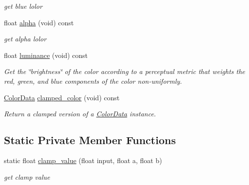 \begin{DoxyCompactItemize}
\begin{DoxyCompactList}\small\item\em get blue lolor \end{DoxyCompactList}\item 
float \hyperlink{classimage__tools_1_1ColorData_a8ae370ebb683fcfab1ce7dfdac9f78a2}{alpha} (void) const \hypertarget{classimage__tools_1_1ColorData_a8ae370ebb683fcfab1ce7dfdac9f78a2}{}\label{classimage__tools_1_1ColorData_a8ae370ebb683fcfab1ce7dfdac9f78a2}

\begin{DoxyCompactList}\small\item\em get alpha lolor \end{DoxyCompactList}\item 
float \hyperlink{classimage__tools_1_1ColorData_a9bea35824e209d2c216739fdc8b9bf3f}{luminance} (void) const \hypertarget{classimage__tools_1_1ColorData_a9bea35824e209d2c216739fdc8b9bf3f}{}\label{classimage__tools_1_1ColorData_a9bea35824e209d2c216739fdc8b9bf3f}

\begin{DoxyCompactList}\small\item\em Get the \char`\"{}brightness\char`\"{} of the color according to a perceptual metric that weights the red, green, and blue components of the color non-\/uniformly. \end{DoxyCompactList}\item 
\hyperlink{classimage__tools_1_1ColorData}{Color\+Data} \hyperlink{classimage__tools_1_1ColorData_add7ac66b4e579f06f59f03c2206a0429}{clamped\+\_\+color} (void) const 
\begin{DoxyCompactList}\small\item\em Return a clamped version of a \hyperlink{classimage__tools_1_1ColorData}{Color\+Data} instance. \end{DoxyCompactList}\end{DoxyCompactItemize}
\subsection*{Static Private Member Functions}
\begin{DoxyCompactItemize}
\item 
static float \hyperlink{classimage__tools_1_1ColorData_ac9c19726be7a97e13b6916ed26822740}{clamp\+\_\+value} (float input, float a, float b)\hypertarget{classimage__tools_1_1ColorData_ac9c19726be7a97e13b6916ed26822740}{}\label{classimage__tools_1_1ColorData_ac9c19726be7a97e13b6916ed26822740}

\begin{DoxyCompactList}\small\item\em get clamp value \end{DoxyCompactList}\end{DoxyCompactItemize}
